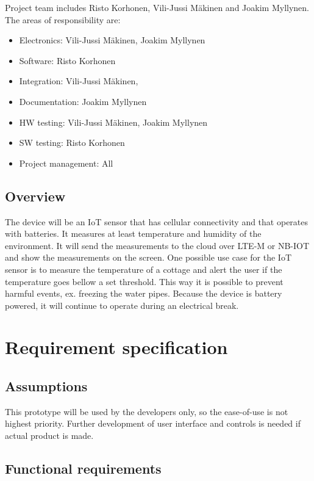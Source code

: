 \documentclass[]{dithesis}
\begin{document}
Project team includes Risto Korhonen, Vili-Jussi Mäkinen and Joakim Myllynen. The areas of responsibility are:

\begin{itemize}
    \item[] Electronics: Vili-Jussi Mäkinen, Joakim Myllynen
    \item[] Software: Risto Korhonen
    \item[] Integration: Vili-Jussi Mäkinen,
    \item[] Documentation: Joakim Myllynen
    \item[] HW testing: Vili-Jussi Mäkinen, Joakim Myllynen
    \item[] SW testing: Risto Korhonen
    \item[] Project management: All
\end{itemize}

\section{Overview}

The device will be an IoT sensor that has cellular connectivity and that operates with batteries. It measures at least temperature and humidity of the environment. It will send the measurements to the cloud over LTE-M or NB-IOT and show the measurements on the screen. One possible use case for the IoT sensor is to measure the temperature of a cottage and alert the user if the temperature goes bellow a set threshold. This way it is possible to prevent harmful events, ex. freezing the water pipes. Because the device is battery powered, it will continue to operate during an electrical break. 

\chapter{Requirement specification}

\section{Assumptions}

This prototype will be used by the developers only, so the ease-of-use is not highest priority. Further development of user interface and controls is needed if actual product is made.

\section{Functional requirements}
\end{document}
